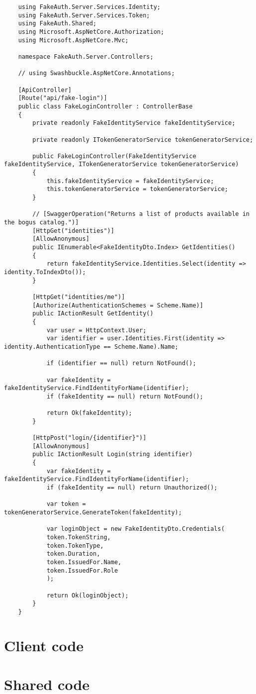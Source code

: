 \begin{verbatim}
    using FakeAuth.Server.Services.Identity;
    using FakeAuth.Server.Services.Token;
    using FakeAuth.Shared;
    using Microsoft.AspNetCore.Authorization;
    using Microsoft.AspNetCore.Mvc;
    
    namespace FakeAuth.Server.Controllers;
    
    // using Swashbuckle.AspNetCore.Annotations;
    
    [ApiController]
    [Route("api/fake-login")]
    public class FakeLoginController : ControllerBase
    {
        private readonly FakeIdentityService fakeIdentityService;
        
        private readonly ITokenGeneratorService tokenGeneratorService;
        
        public FakeLoginController(FakeIdentityService fakeIdentityService, ITokenGeneratorService tokenGeneratorService)
        {
            this.fakeIdentityService = fakeIdentityService;
            this.tokenGeneratorService = tokenGeneratorService;
        }
        
        // [SwaggerOperation("Returns a list of products available in the bogus catalog.")]
        [HttpGet("identities")]
        [AllowAnonymous]
        public IEnumerable<FakeIdentityDto.Index> GetIdentities()
        {
            return fakeIdentityService.Identities.Select(identity => identity.ToIndexDto());
        }
        
        [HttpGet("identities/me")]
        [Authorize(AuthenticationSchemes = Scheme.Name)]
        public IActionResult GetIdentity()
        {
            var user = HttpContext.User;
            var identifier = user.Identities.First(identity => identity.AuthenticationType == Scheme.Name).Name;
            
            if (identifier == null) return NotFound();
            
            var fakeIdentity = fakeIdentityService.FindIdentityForName(identifier);
            if (fakeIdentity == null) return NotFound();
            
            return Ok(fakeIdentity);
        }
        
        [HttpPost("login/{identifier}")]
        [AllowAnonymous]
        public IActionResult Login(string identifier)
        {
            var fakeIdentity = fakeIdentityService.FindIdentityForName(identifier);
            if (fakeIdentity == null) return Unauthorized();
            
            var token = tokenGeneratorService.GenerateToken(fakeIdentity);
            
            var loginObject = new FakeIdentityDto.Credentials(
            token.TokenString,
            token.TokenType,
            token.Duration,
            token.IssuedFor.Name,
            token.IssuedFor.Role
            );
            
            return Ok(loginObject);
        }
    }
\end{verbatim}

\section{Client code}
\label{ch:package-client}

\section{Shared code}
\label{ch:package-shared}